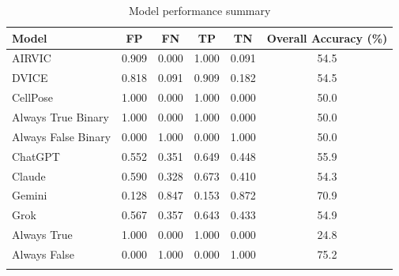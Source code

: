 \begin{table}[htbp]
\centering
\caption{Model performance summary}
\label{tab:aggregate-results}

\begin{tabular}{lccccc}
\toprule
\textbf{Model} & \textbf{FP} & \textbf{FN} & \textbf{TP} & \textbf{TN} & \textbf{Overall Accuracy (\%)} \\
\midrule
\arrayrulecolor{gray!30}
AIRVIC     & 0.909 & 0.000 & 1.000 & 0.091 & 54.5 \\
\hline
DVICE   & 0.818 & 0.091 & 0.909 & 0.182 & 54.5 \\
\hline
CellPose   & 1.000 & 0.000 & 1.000 & 0.000 & 50.0 \\
\hline
Always True Binary   & 1.000 & 0.000 & 1.000 & 0.000 & 50.0 \\
\hline
Always False Binary   & 0.000 & 1.000 & 0.000 & 1.000 & 50.0 \\
\hline
ChatGPT    & 0.552 & 0.351 & 0.649 & 0.448 & 55.9 \\
\hline
Claude     & 0.590 & 0.328 & 0.673 & 0.410 & 54.3 \\
\hline
Gemini     & 0.128 & 0.847 & 0.153 & 0.872 & 70.9 \\
\hline
Grok       & 0.567 & 0.357 & 0.643 & 0.433 & 54.9 \\
\hline
Always True       & 1.000 & 0.000 & 1.000 & 0.000 & 24.8 \\
\hline
Always False      & 0.000 & 1.000 & 0.000 & 1.000 & 75.2 \\
\arrayrulecolor{black}
\bottomrule
\end{tabular}

\end{table}